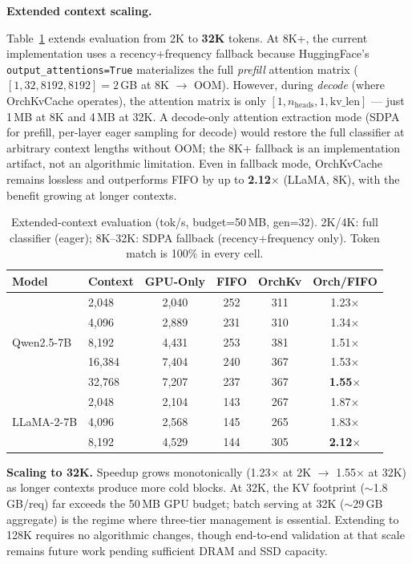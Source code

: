 \documentclass[conference]{IEEEtran}
\begin{document}
\textbf{Extended context scaling.}
\label{sec:scale}

Table~\ref{tab:scale} extends evaluation from 2K to \textbf{32K} tokens. At 8K+, the current implementation uses a recency+frequency fallback because HuggingFace's \texttt{output\_attentions=True} materializes the full \emph{prefill} attention matrix ($[1, 32, 8192, 8192]{=}2$\,GB at 8K $\to$ OOM). However, during \emph{decode} (where OrchKvCache operates), the attention matrix is only $[1, n_{\text{heads}}, 1, \text{kv\_len}]$ --- just 1\,MB at 8K and 4\,MB at 32K. A decode-only attention extraction mode (SDPA for prefill, per-layer eager sampling for decode) would restore the full classifier at arbitrary context lengths without OOM; the 8K+ fallback is an implementation artifact, not an algorithmic limitation. Even in fallback mode, OrchKvCache remains lossless and outperforms FIFO by up to \textbf{2.12$\times$} (LLaMA, 8K), with the benefit growing at longer contexts.

\begin{table}[t]
\centering
\caption{Extended-context evaluation (tok/s, budget=50\,MB, gen=32). 2K/4K: full classifier (eager); 8K--32K: SDPA fallback (recency+frequency only). Token match is 100\% in every cell.}
\label{tab:scale}
\footnotesize
\setlength{\tabcolsep}{4pt}
\begin{tabular}{@{}llcccc@{}}
\toprule
Model & Context & GPU-Only & FIFO & OrchKv & Orch/FIFO \\
\midrule
\multirow{5}{*}{Qwen2.5-7B}
& 2{,}048  & 2{,}040 & 252  & 311  & 1.23$\times$ \\
& 4{,}096  & 2{,}889 & 231  & 310  & 1.34$\times$ \\
& 8{,}192  & 4{,}431 & 253  & 381  & 1.51$\times$ \\
& 16{,}384 & 7{,}404 & 240  & 367  & 1.53$\times$ \\
& 32{,}768 & 7{,}207 & 237  & 367  & \textbf{1.55$\times$} \\
\midrule
\multirow{3}{*}{LLaMA-2-7B}
& 2{,}048  & 2{,}104 & 143  & 267  & 1.87$\times$ \\
& 4{,}096  & 2{,}568 & 145  & 265  & 1.83$\times$ \\
& 8{,}192  & 4{,}529 & 144  & 305  & \textbf{2.12$\times$} \\
\bottomrule
\end{tabular}
\end{table}

\textbf{Scaling to 32K.} Speedup grows monotonically (1.23$\times$ at 2K $\to$ 1.55$\times$ at 32K) as longer contexts produce more cold blocks. At 32K, the KV footprint (${\sim}$1.8\,GB/req) far exceeds the 50\,MB GPU budget; batch serving at 32K (${\sim}$29\,GB aggregate) is the regime where three-tier management is essential. Extending to 128K requires no algorithmic changes, though end-to-end validation at that scale remains future work pending sufficient DRAM and SSD capacity.
\end{document}
